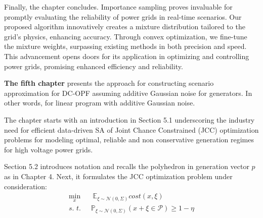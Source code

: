 Finally, the chapter concludes. Importance sampling proves invaluable for promptly evaluating the reliability of power grids in real-time scenarios. Our proposed algorithm innovatively creates a mixture distribution tailored to the grid's physics, enhancing accuracy. Through convex optimization, we fine-tune the mixture weights, surpassing existing methods in both precision and speed. This advancement opens doors for its application in optimizing and controlling power grids, promising enhanced efficiency and reliability.

\textbf{The fifth chapter} presents the approach for constructing scenario approximation for DC-OPF assuming additive Gaussian noise for generators. In other words, for linear program with additive Gaussian noise. 

The chapter starts with an introduction in Section 5.1 underscoring the industry need for efficient data-driven SA of Joint Chance Constrained (JCC) optimization problems for modeling optimal, reliable and non conservative generation regimes for high voltage power grids. 

Section 5.2 introduces notation and recalls the polyhedron in generation vector $p$ as in Chapter 4. Next, it formulates the JCC optimization problem under consideration:
\begin{equation}\label{eq:JCC-OPF}
    \begin{aligned}
  \min_x & \;\mathbb{E}_{\xi\sim \mathcal{N}(0, \Sigma)} \textit{cost}(x,\xi)\\
   \textit{s. t. }\; & \mathbb{P}_{\xi\sim \mathcal{N}(0, \Sigma)} (x+\xi \in \mathcal{P}) \ge 1 - \eta
   \end{aligned}
\end{equation}

